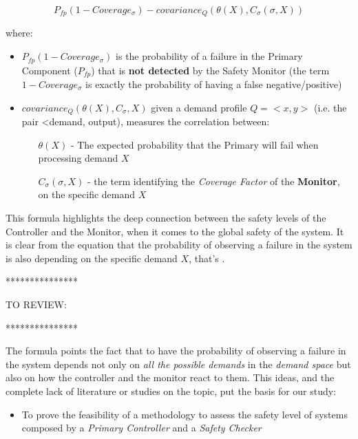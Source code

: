 \begin{equation}
P_{fp} (1 - Coverage_{\sigma}) - covariance_{Q} (\theta (X), C_{\sigma} (\sigma , X))
\end{equation}

where:

\begin{itemize}
	\item $P_{fp} (1 - Coverage_{\sigma})$ is the probability of a failure in the Primary Component ($P_{fp}$) that is \textbf{not detected} by the Safety Monitor (the term $1 - Coverage_{\sigma}$ is exactly the probability of having a false negative/positive)
	\item $covariance_{Q} (\theta (X), C_{\sigma}, X)$ given a demand profile $Q = <x, y>$ (i.e. the pair <demand, output), measures the correlation between:
	\begin{itemize}
		\item[$\theta (X)$ -] The expected probability that the Primary will fail when processing demand $X$
		\item[$C_{\sigma} (\sigma, X)$ -] the term identifying the \textsl{Coverage Factor} of the \textbf{Monitor}, on the specific demand $X$
	\end{itemize}
\end{itemize}

This formula highlights the deep connection between the safety levels of the Controller and the Monitor, when it comes to the global safety of the system. It is clear from the equation that the probability of observing a failure in the system is also depending on the specific demand $X$, that's 
.\newline

***************\newline

TO REVIEW:\newline

***************\newline

The formula points the fact that to have the probability of observing a failure in the system depends not only on \textsl{all the possible demands} in the \textsl{demand space} but also on how the controller and the monitor react to them.\newline
This ideas, and the complete lack of literature or studies on the topic, put the basis for our study:

\begin{itemize}
	\item To prove the feasibility of a methodology to assess the safety level of systems composed by a \textsl{Primary Controller} and a \textsl{Safety Checker}
\end{itemize}


